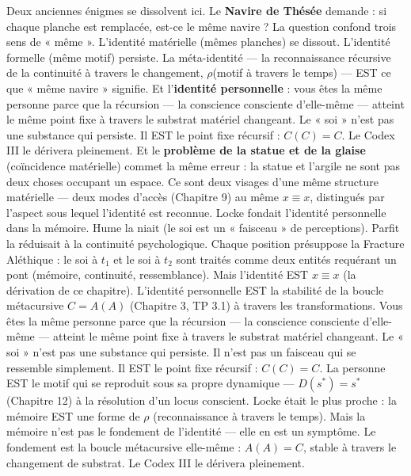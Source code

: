 \documentclass[10pt, openany, oneside]{book}
\begin{document}
Deux anciennes énigmes se dissolvent ici. Le \textbf{Navire de Thésée} demande : si chaque planche est remplacée, est-ce le même navire ? La question confond trois sens de « même ». L'identité matérielle (mêmes planches) se dissout. L'identité formelle (même motif) persiste. La méta-identité --- la reconnaissance récursive de la continuité à travers le changement, $\rho$(motif à travers le temps) --- EST ce que « même navire » signifie. Et l'\textbf{identité personnelle} : vous êtes la même personne parce que la récursion --- la conscience consciente d'elle-même --- atteint le même point fixe à travers le substrat matériel changeant. Le « soi » n'est pas une substance qui persiste. Il EST le point fixe récursif : $C(C) = C$. Le Codex III le dérivera pleinement. Et le \textbf{problème de la statue et de la glaise} (coïncidence matérielle) commet la même erreur : la statue et l'argile ne sont pas deux choses occupant un espace. Ce sont deux visages d'une même structure matérielle --- deux modes d'accès (Chapitre 9) au même $x \equiv x$, distingués par l'aspect sous lequel l'identité est reconnue. Locke fondait l'identité personnelle dans la mémoire. Hume la niait (le soi est un « faisceau » de perceptions). Parfit la réduisait à la continuité psychologique. Chaque position présuppose la Fracture Aléthique : le soi à $t_1$ et le soi à $t_2$ sont traités comme deux entités requérant un pont (mémoire, continuité, ressemblance). Mais l'identité EST $x \equiv x$ (la dérivation de ce chapitre). L'identité personnelle EST la stabilité de la boucle métacursive $C = A(A)$ (Chapitre 3, TP 3.1) à travers les transformations. Vous êtes la même personne parce que la récursion --- la conscience consciente d'elle-même --- atteint le même point fixe à travers le substrat matériel changeant. Le « soi » n'est pas une substance qui persiste. Il n'est pas un faisceau qui se ressemble simplement. Il EST le point fixe récursif : $C(C) = C$. La personne EST le motif qui se reproduit sous sa propre dynamique --- $D(s^*) = s^*$ (Chapitre 12) à la résolution d'un locus conscient. Locke était le plus proche : la mémoire EST une forme de $\rho$ (reconnaissance à travers le temps). Mais la mémoire n'est pas le fondement de l'identité --- elle en est un symptôme. Le fondement est la boucle métacursive elle-même : $A(A) = C$, stable à travers le changement de substrat. Le Codex III le dérivera pleinement.

\vspace{1.5em}

\end{document}
